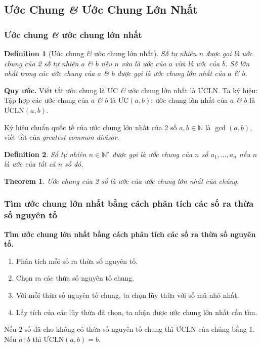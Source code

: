 \documentclass{article}
\numberwithin{equation}{section}
\newtheorem{definition}{Definition}[section]
\newtheorem{theorem}{Theorem}[section]
\begin{document}
\subsection{Ước Chung \textit{\&} Ước Chung Lớn Nhất}

\subsubsection{Ước chung \textit{\&} ước chung lớn nhất}

\begin{definition}[Ước chung \textit{\&} ước chung lớn nhất]
	Số tự nhiên $n$ được gọi là \emph{ước chung} của 2 số tự nhiên $a$ \textit{\&} $b$ nếu $n$ vừa là ước của $a$ vừa là ước của $b$. Số lớn nhất trong các ước chung của $a$ \textit{\&} $b$ được gọi là \emph{ước chung lớn nhất} của $a$ \textit{\&} $b$.
\end{definition}
\noindent\textbf{Quy ước.} Viết tắt ước chung là ƯC \textit{\&} ước chung lớn nhất là ƯCLN. Ta ký hiệu: Tập hợp các ước chung của $a$ \textit{\&} $b$ là $\mbox{ƯC}(a,b)$; ước chung lớn nhất của $a$ \textit{\&} $b$ là $\mbox{ƯCLN}(a,b)$.

Ký hiệu chuẩn quốc tế của ước chung lớn nhất của 2 số $a,b\in\mathbb{N}$ là $\gcd(a,b)$, viết tắt của \textit{greatest common divisor}.

\begin{definition}
	Số tự nhiên $n\in\mathbb{N}^\star$ được gọi là \emph{ước chung} của $n$ số $a_1,\ldots,a_n$ nếu $n$ là ước của tất cả $n$ số đó.
\end{definition}

\begin{theorem}
	Ước chung của 2 số là ước của ước chung lớn nhất của chúng.
\end{theorem}

\subsubsection{Tìm ước chung lớn nhất bằng cách phân tích các số ra thừa số nguyên tố}
\begin{tcolorbox}
	\textbf{Tìm ước chung lớn nhất bằng cách phân  tích các số ra thừa số nguyên tố.}
	\begin{enumerate}
		\item Phân tích mỗi số ra thừa số nguyên tố.
		\item Chọn ra các thừa số nguyên tố chung.
		\item Với mỗi thừa số nguyên tố chung, ta chọn lũy thừa với số mũ nhỏ nhất.
		\item Lấy tích của các lũy thừa đã chọn, ta nhận được ước chung lớn nhất cần tìm.
	\end{enumerate}
\end{tcolorbox}
Nếu 2 số đã cho không có thừa số nguyên tố chung thì ƯCLN của chúng bằng 1. Nếu $a\ \vdots\ b$ thì $\mbox{ƯCLN}(a,b) = b$.
\end{document}
